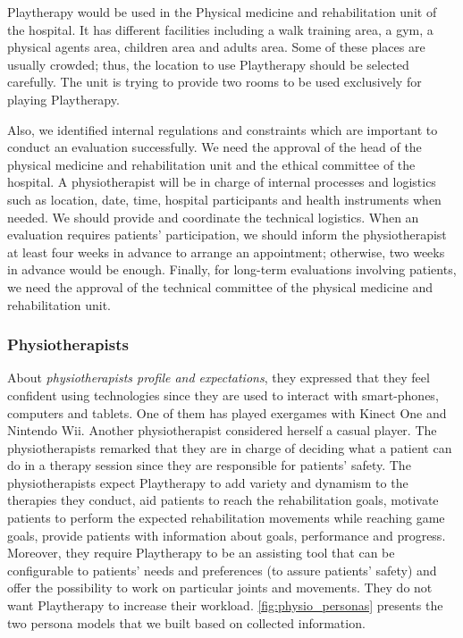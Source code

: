 Playtherapy would be used in the Physical medicine and rehabilitation unit of the hospital. It has different facilities including a walk training area, a gym, a physical agents area, children area and adults area. Some of these places are usually crowded; thus, the location to use Playtherapy should be selected carefully. The unit is trying to provide two rooms to be used exclusively for playing Playtherapy.

Also, we identified internal regulations and constraints which are important to conduct an evaluation successfully. We need the approval of the head of the physical medicine and rehabilitation unit and the ethical committee of the hospital. A physiotherapist will be in charge of internal processes and logistics such as location, date, time, hospital participants and health instruments when needed. We should provide and coordinate the technical logistics. When an evaluation requires patients' participation, we should inform the physiotherapist at least four weeks in advance to arrange an appointment; otherwise, two weeks in advance would be enough. Finally, for long-term evaluations involving patients, we need the approval of the technical committee of the physical medicine and rehabilitation unit.

\subsubsection{Physiotherapists}
About \emph{physiotherapists profile and expectations}, they expressed that they feel confident using technologies since they are used to interact with smart-phones, computers and tablets. One of them has played exergames with Kinect One and Nintendo Wii. Another physiotherapist considered herself a casual player. The physiotherapists remarked that they are in charge of deciding what a patient can do in a therapy session since they are responsible for patients' safety. The physiotherapists expect Playtherapy to add variety and dynamism to the therapies they conduct, aid patients to reach the rehabilitation goals, motivate patients to perform the expected rehabilitation movements while reaching game goals, provide patients with information about goals, performance and progress. Moreover, they require Playtherapy to be an assisting tool that can be configurable to patients' needs and preferences (to assure patients' safety) and offer the possibility to work on particular joints and movements. They do not want Playtherapy to increase their workload. \autoref{fig:physio_personas} presents the two persona models that we built based on collected information.

